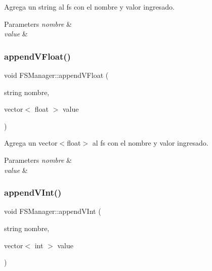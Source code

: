 Agrega un string al fs con el nombre y valor ingresado. 


\begin{DoxyParams}{Parameters}
{\em nombre} & \\
\hline
{\em value} & \\
\hline
\end{DoxyParams}
\mbox{\label{classFSManager_ad6419bbb1dbc6c1059642416045dbd99}} 
\subsubsection{\texorpdfstring{append\+V\+Float()}{appendVFloat()}}
{\footnotesize\ttfamily void F\+S\+Manager\+::append\+V\+Float (\begin{DoxyParamCaption}\item[{string}]{nombre,  }\item[{vector$<$ float $>$}]{value }\end{DoxyParamCaption})\hspace{0.3cm}{\ttfamily [inline]}}



Agrega un vector$<$float$>$ al fs con el nombre y valor ingresado. 


\begin{DoxyParams}{Parameters}
{\em nombre} & \\
\hline
{\em value} & \\
\hline
\end{DoxyParams}
\mbox{\label{classFSManager_a5c589c828a37b0d0231fd47436ba63b5}} 
\subsubsection{\texorpdfstring{append\+V\+Int()}{appendVInt()}}
{\footnotesize\ttfamily void F\+S\+Manager\+::append\+V\+Int (\begin{DoxyParamCaption}\item[{string}]{nombre,  }\item[{vector$<$ int $>$}]{value }\end{DoxyParamCaption})\hspace{0.3cm}{\ttfamily [inline]}}



